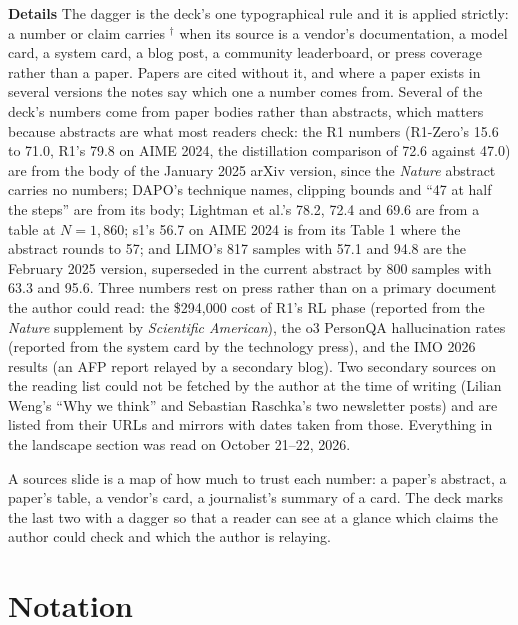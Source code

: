 \documentclass[11pt,letterpaper]{article}
\newcommand{\setstage}[1]{\colorlet{stagec}{#1}}
\newcommand{\para}[1]{\medskip\noindent\textbf{#1}\quad}
\newenvironment{intuition}{\begin{tcolorbox}[intuitionbox]}{\end{tcolorbox}}
\newcommand{\paper}[1]{\textit{#1}}
\begin{document}
\para{Details} The dagger is the deck's one typographical rule and it is applied strictly: a number or claim carries $^\dagger$ when its source is a vendor's documentation, a model card, a system card, a blog post, a community leaderboard, or press coverage rather than a paper. Papers are cited without it, and where a paper exists in several versions the notes say which one a number comes from. Several of the deck's numbers come from paper bodies rather than abstracts, which matters because abstracts are what most readers check: the R1 numbers (R1-Zero's 15.6 to 71.0, R1's 79.8 on AIME 2024, the distillation comparison of 72.6 against 47.0) are from the body of the January 2025 arXiv version, since the \paper{Nature} abstract carries no numbers; DAPO's technique names, clipping bounds and ``47 at half the steps'' are from its body; Lightman et al.'s 78.2, 72.4 and 69.6 are from a table at $N=1{,}860$; s1's 56.7 on AIME 2024 is from its Table 1 where the abstract rounds to 57; and LIMO's 817 samples with 57.1 and 94.8 are the February 2025 version, superseded in the current abstract by 800 samples with 63.3 and 95.6. Three numbers rest on press rather than on a primary document the author could read: the \$294,000 cost of R1's RL phase (reported from the \paper{Nature} supplement by \paper{Scientific American}), the o3 PersonQA hallucination rates (reported from the system card by the technology press), and the IMO 2026 results (an AFP report relayed by a secondary blog). Two secondary sources on the reading list could not be fetched by the author at the time of writing (Lilian Weng's ``Why we think'' and Sebastian Raschka's two newsletter posts) and are listed from their URLs and mirrors with dates taken from those. Everything in the landscape section was read on October 21--22, 2026.

\begin{intuition}
A sources slide is a map of how much to trust each number: a paper's abstract, a paper's table, a vendor's card, a journalist's summary of a card. The deck marks the last two with a dagger so that a reader can see at a glance which claims the author could check and which the author is relaying.
\end{intuition}
\clearpage
\appendix
\setstage{ink}
\section{Notation}
\end{document}
